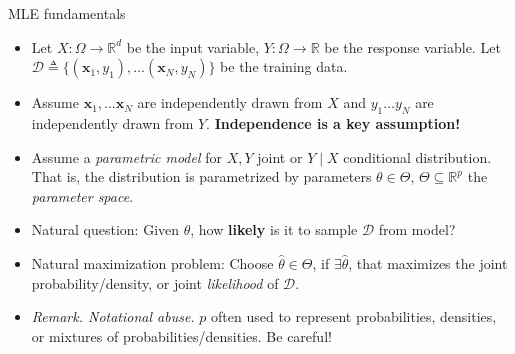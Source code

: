 \documentclass{beamer}
\numberwithin{equation}{section}
\begin{document}
\begin{frame}{MLE fundamentals}
    \begin{itemize}
        \item
        Let $ X : \Omega \rightarrow \mathbb{R}^d $ be the input variable,
        $ Y : \Omega \rightarrow \mathbb{R} $ be the response variable. Let
        $ \mathcal{D} \triangleq \{(\mathbf{x}_1, y_1), \ldots
        (\mathbf{x}_N, y_N)\} $ be the training data.

        \item
        Assume $ \mathbf{x}_1, \ldots \mathbf{x}_N $ are independently drawn
        from $ X $ and $ y_1 \ldots y_N $ are independently drawn from $ Y $.
        \textbf{Independence is a key assumption!}

        \item
        Assume a \textit{parametric model} for $ X, Y $ joint or $ Y \mid X $
        conditional distribution. That is, the distribution is parametrized
        by parameters $ \theta \in \Theta $, $ \Theta \subseteq \mathbb{R}^p $
        the \textit{parameter space}.

        \item
        Natural question: Given $ \theta $, how \textbf{likely} is it to
        sample $ \mathcal{D} $ from model?

        \item
        Natural maximization problem: Choose $ \hat{\theta} \in \Theta $, if
        $ \exists \hat{\theta} $, that maximizes the joint
        probability/density, or joint \textit{likelihood} of $ \mathcal{D} $.

        \item
        \textit{Remark. Notational abuse.} $ p $ often used to represent
        probabilities, densities, or mixtures of probabilities/densities.
        Be careful!
    \end{itemize}
\end{frame}
\end{document}
